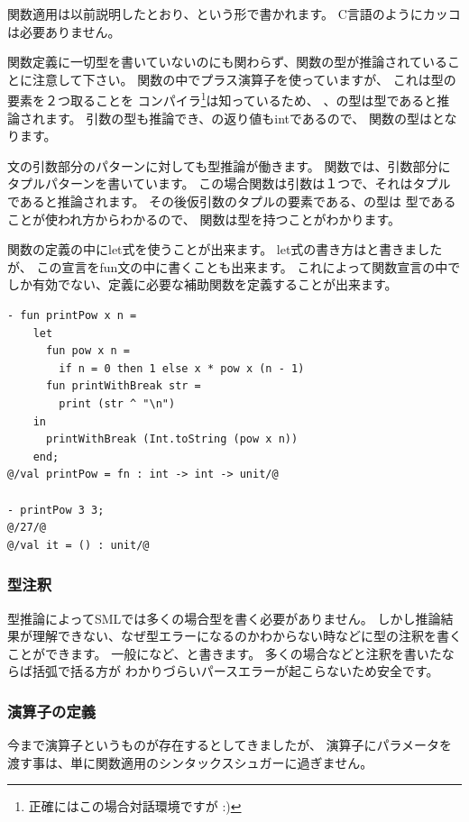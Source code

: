 \documentclass[11pt,a4paper]{jarticle}
\begin{document}
関数適用は以前説明したとおり、という形で書かれます。
C言語のようにカッコは必要ありません。

関数定義に一切型を書いていないのにも関わらず、関数の型が推論されていることに注意して下さい。
関数の中でプラス演算子を使っていますが、
これは型の要素を２つ取ることを
コンパイラ\footnote{正確にはこの場合対話環境ですが :)}は知っているため、
、の型は型であると推論されます。
引数の型も推論でき、の返り値もintであるので、
関数の型はとなります。

文の引数部分のパターンに対しても型推論が働きます。
関数では、引数部分にタプルパターンを書いています。
この場合関数は引数は１つで、それはタプルであると推論されます。
その後仮引数のタプルの要素である、の型は
型であることが使われ方からわかるので、
関数は型を持つことがわかります。

関数の定義の中にlet式を使うことが出来ます。
let式の書き方はと書きましたが、
この宣言をfun文の中に書くことも出来ます。
これによって関数宣言の中でしか有効でない、定義に必要な補助関数を定義することが出来ます。

\begin{lstlisting}[caption=ネストした関数宣言,label=code:nested-fun]
- fun printPow x n =
    let
      fun pow x n =
        if n = 0 then 1 else x * pow x (n - 1)
      fun printWithBreak str =
        print (str ^ "\n")
    in
      printWithBreak (Int.toString (pow x n))
    end;
@/val printPow = fn : int -> int -> unit/@

- printPow 3 3;
@/27/@
@/val it = () : unit/@
\end{lstlisting}

\subsubsection{型注釈}

型推論によってSMLでは多くの場合型を書く必要がありません。
しかし推論結果が理解できない、なぜ型エラーになるのかわからない時などに型の注釈を書くことができます。
一般になど、と書きます。
多くの場合などと注釈を書いたならば括弧で括る方が
わかりづらいパースエラーが起こらないため安全です。

\subsubsection{演算子の定義}
今まで演算子というものが存在するとしてきましたが、
演算子にパラメータを渡す事は、単に関数適用のシンタックスシュガーに過ぎません。
\end{document}
